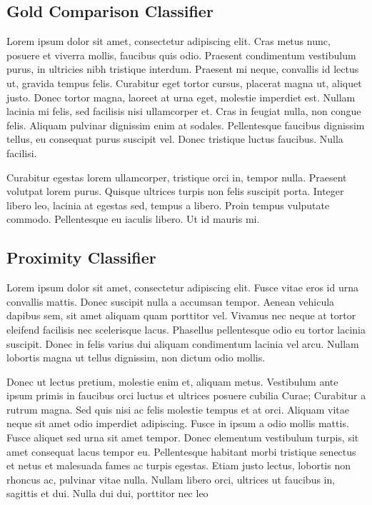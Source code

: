 \documentclass[preprint,5p,times,twocolumn]{elsarticle}
\begin{document}
\subsection{Gold Comparison Classifier}
\label{results:gold}

Lorem ipsum dolor sit amet, consectetur adipiscing elit. Cras metus nunc,
posuere et viverra mollis, faucibus quis odio. Praesent condimentum vestibulum
purus, in ultricies nibh tristique interdum. Praesent mi neque, convallis id
lectus ut, gravida tempus felis. Curabitur eget tortor cursus, placerat magna
ut, aliquet justo. Donec tortor magna, laoreet at urna eget, molestie imperdiet
est. Nullam lacinia mi felis, sed facilisis nisi ullamcorper et. Cras in
feugiat nulla, non congue felis. Aliquam pulvinar dignissim enim at sodales.
Pellentesque faucibus dignissim tellus, eu consequat purus suscipit vel. Donec
tristique luctus faucibus. Nulla facilisi.

Curabitur egestas lorem ullamcorper, tristique orci in, tempor nulla. Praesent
volutpat lorem purus. Quisque ultrices turpis non felis suscipit porta. Integer
libero leo, lacinia at egestas sed, tempus a libero. Proin tempus vulputate
commodo. Pellentesque eu iaculis libero. Ut id mauris mi.

\subsection{Proximity Classifier}
\label{results:proximity}

Lorem ipsum dolor sit amet, consectetur adipiscing elit. Fusce vitae eros id
urna convallis mattis. Donec suscipit nulla a accumsan tempor. Aenean vehicula
dapibus sem, sit amet aliquam quam porttitor vel. Vivamus nec neque at tortor
eleifend facilisis nec scelerisque lacus. Phasellus pellentesque odio eu tortor
lacinia suscipit. Donec in felis varius dui aliquam condimentum lacinia vel
arcu. Nullam lobortis magna ut tellus dignissim, non dictum odio mollis.

Donec ut lectus pretium, molestie enim et, aliquam metus. Vestibulum ante ipsum
primis in faucibus orci luctus et ultrices posuere cubilia Curae; Curabitur a
rutrum magna. Sed quis nisi ac felis molestie tempus et at orci. Aliquam vitae
neque sit amet odio imperdiet adipiscing. Fusce in ipsum a odio mollis mattis.
Fusce aliquet sed urna sit amet tempor. Donec elementum vestibulum turpis, sit
amet consequat lacus tempor eu. Pellentesque habitant morbi tristique senectus
et netus et malesuada fames ac turpis egestas. Etiam justo lectus, lobortis non
rhoncus ac, pulvinar vitae nulla. Nullam libero orci, ultrices ut faucibus in,
sagittis et dui. Nulla dui dui, porttitor nec leo
\end{document}

